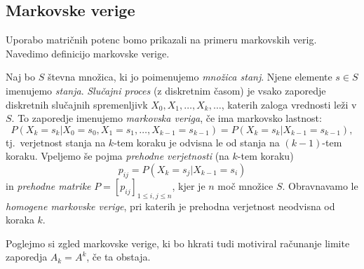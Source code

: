 \documentclass[mat1]{fmfdelo}
\begin{document}
\subsection{Markovske verige}\label{podpoglavjeMarkovskeVerige}

Uporabo matričnih potenc bomo prikazali na primeru markovskih verig. Navedimo definicijo markovske verige.
\begin{definicija}\label{definicijaMarkov}
    Naj bo $S$ števna množica, ki jo poimenujemo \emph{množica stanj}. Njene elemente $s \in S$ imenujemo \emph{stanja}. \emph{Slučajni proces} (z diskretnim časom) je vsako zaporedje diskretnih slučajnih spremenljivk $X_0, X_1, \ldots, X_k, \ldots$, katerih zaloga vrednosti leži v $S$. To zaporedje imenujemo \emph{markovska veriga}, če ima markovsko lastnost:
    \begin{equation*}
        P\left(X_k = s_k | X_0 = s_0, X_1 = s_1, \ldots, X_{k-1} = s_{k-1}\right) = P\left(X_k = s_k | X_{k-1} = s_{k-1}\right),
    \end{equation*}
    tj.\ verjetnost stanja na $k$-tem koraku je odvisna le od stanja na $(k-1)$-tem koraku. Vpeljemo še pojma \emph{prehodne verjetnosti} (na $k$-tem koraku)
    \begin{equation*}
        p_{ij} = P\left(X_k = s_j | X_{k-1} = s_i\right)
    \end{equation*}
    in \emph{prehodne matrike} $P = [p_{ij}]_{1 \leq i,j \leq n}$, kjer je $n$ moč množice $S$. Obravnavamo le \emph{homogene markovske verige}, pri katerih je prehodna verjetnost neodvisna od koraka $k$.
\end{definicija}
Poglejmo si zgled markovske verige, ki bo hkrati tudi motiviral računanje limite zaporedja $A_k = A^k$, če ta obstaja. 
\end{document}

